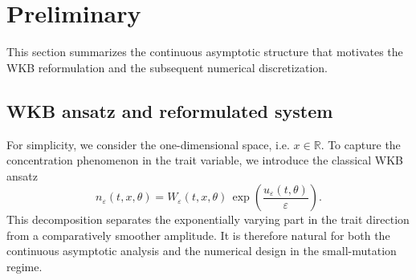 \documentclass[11pt]{article}
\begin{document}
\section{Preliminary}\label{sec:proliminary}
This section summarizes the continuous asymptotic structure that motivates the WKB reformulation and the subsequent numerical discretization.
\subsection{WKB ansatz and reformulated system}
For simplicity, we consider the one-dimensional space, i.e. $x\in\mathbb{R}$. 
To capture the concentration phenomenon in the trait variable, we introduce the classical WKB ansatz
\begin{equation}\label{eq:WKB}
   n_\varepsilon(t, x,\theta)
   = W_\varepsilon(t, x,\theta)\,
   \exp\!\left(\frac{u_\varepsilon(t,\theta)}{\varepsilon}\right).
\end{equation}
This decomposition separates the exponentially varying part in the trait direction from a comparatively smoother amplitude. It is therefore natural for both the continuous asymptotic analysis and the numerical design in the small-mutation regime.
\end{document}

